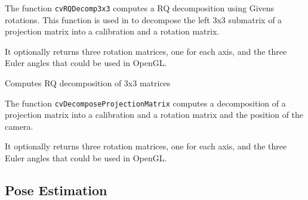 The function \texttt{cvRQDecomp3x3} computes a RQ decomposition using Givens rotations. This function is used in  to decompose the left 3x3 submatrix of a projection matrix into a calibration and a rotation matrix.

It optionally returns three rotation matrices, one for each axis, and the three Euler angles that could be used in OpenGL.


\label{DecomposeProjectionMatrix}

Computes RQ decomposition of 3x3 matrices


\begin{description}
\end{description}

The function \texttt{cvDecomposeProjectionMatrix} computes a decomposition of a projection matrix into a calibration and a rotation matrix and the position of the camera.

It optionally returns three rotation matrices, one for each axis, and the three Euler angles that could be used in OpenGL.


\subsection{Pose Estimation}


\label{CreatePOSITObject}

